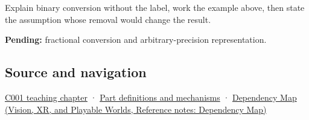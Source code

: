 Explain binary conversion without the label, work the example above, then state the assumption whose removal would change the result.

\textbf{Pending:} fractional conversion and arbitrary-precision representation.

\subsection{Source and navigation}\label{appendix-dc552784a2c0-source-and-navigation}

\hyperref[01-foundations-i-ch001-from-a-signal-to-an-interpretation]{C001 teaching chapter} · \hyperref[appendix-fd090d982a15]{Part definitions and mechanisms} · \href{../07-Vision-XR-and-Playable-Worlds/main.pdf\#nameddest=appendix-4ad47bdd269a}{Dependency Map (Vision, XR, and Playable Worlds, Reference notes: Dependency Map)}
